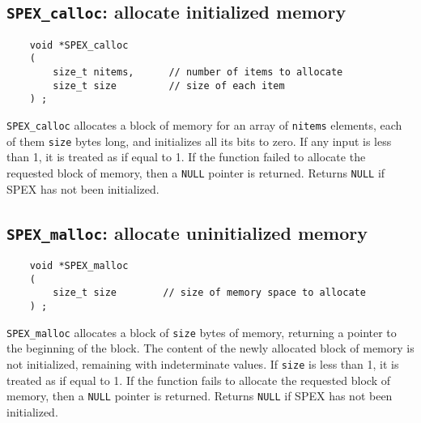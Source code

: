 \documentclass[12pt,oneside]{book}
\theoremstyle{definition}
\begin{document}
\subsection{\texttt{SPEX\_calloc}: allocate initialized memory} \label{ss:SPEX_calloc}
\begin{mdframed}[userdefinedwidth=\textwidth]
{\footnotesize
\begin{verbatim}
    void *SPEX_calloc 
    ( 
        size_t nitems,      // number of items to allocate 
        size_t size         // size of each item 
    ) ;
\end{verbatim}
} \end{mdframed}

\verb|SPEX_calloc| allocates a block of memory for an array of \verb|nitems|
elements, each of them \verb|size| bytes long, and initializes all its bits to
zero. If any input is less than 1, it is treated as if equal to 1. If the
function failed to allocate the requested block of memory, then a \verb|NULL|
pointer is returned.
Returns \verb|NULL| if SPEX has not been initialized.


\newpage
\subsection{\texttt{SPEX\_malloc}: allocate uninitialized memory} \label{ss:SPEX_malloc}
\begin{mdframed}[userdefinedwidth=\textwidth]
{\footnotesize
\begin{verbatim}
    void *SPEX_malloc
    (
        size_t size        // size of memory space to allocate
    ) ;
\end{verbatim}
} \end{mdframed}

\verb|SPEX_malloc| allocates a block of \verb|size| bytes of memory, returning
a pointer to the beginning of the block. The content of the newly allocated
block of memory is not initialized, remaining with indeterminate values.
If \verb|size| is less than 1, it is treated as if equal to 1. If the function
fails to allocate the requested block of memory, then a \verb|NULL| pointer is
returned.
Returns \verb|NULL| if SPEX has not been initialized.
\end{document}
